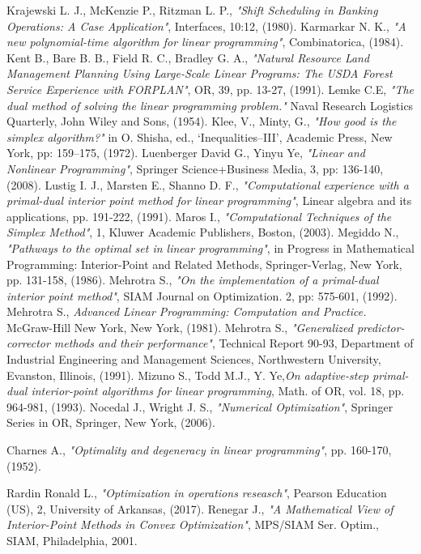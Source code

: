 \documentclass[a4paper,10 pt,titlepage,twoside]{book}
\theoremstyle{plain}
\theoremstyle{definition}
\theoremstyle{remark}
\begin{document}
{{\begin{thebibliography}{9}
		Krajewski L. J., McKenzie P., Ritzman L. P.,\textit{ "Shift Scheduling in Banking Operations: A Case Application"}, Interfaces, 10:12, (1980).
		 Karmarkar N. K.,\emph{ "A new polynomial-time algorithm for linear programming"}, Combinatorica, (1984).
		 Kent B., Bare B. B., Field R. C., Bradley G. A., \textit{"Natural Resource Land Management Planning Using Large-Scale Linear Programs: The USDA Forest Service Experience with FORPLAN"}, OR, 39, pp. 13-27, (1991).
		 Lemke C.E,\textit{ "The dual method of solving the linear programming problem."} Naval Research Logistics Quarterly, John Wiley and Sons, (1954).
		 Klee, V., Minty, G.,\emph{ "How good is the simplex algorithm?"} in O. Shisha, ed., ‘Inequalities–III’, Academic Press, New York, pp: 159–175, (1972).
		Luenberger David G., Yinyu Ye, \emph{"Linear and Nonlinear Programming"}, Springer Science+Business Media, 3, pp: 136-140, (2008).
		 Lustig I. J., Marsten E., Shanno D. F.,\emph{ "Computational experience with a primal-dual interior point method for linear programming"}, Linear algebra and its applications, pp. 191-222, (1991).
		 Maros I., \emph{"Computational Techniques of the Simplex Method"}, 1, Kluwer
		Academic Publishers, Boston, (2003).
		 Megiddo N., \emph{"Pathways to the optimal set in linear programming"}, in Progress in Mathematical Programming: Interior-Point and Related Methods, Springer-Verlag, New York, pp. 131-158, (1986).
	 Mehrotra S., \emph{ "On the implementation of a primal-dual interior point method"}, SIAM Journal on Optimization. 2, pp: 575-601, (1992).
	 Mehrotra S., \emph{ Advanced Linear Programming: Computation and
	Practice. } McGraw-Hill New York, New York, (1981).
 Mehrotra S., \emph{"Generalized predictor-corrector methods and their performance"}, Technical Report 90-93, Department of Industrial Engineering and Management Sciences, Northwestern University, Evanston, Illinois, (1991).
		Mizuno S., Todd M.J., Y. Ye,\emph{\;On adaptive-step primal-dual interior-point algorithms for linear programming}, Math. of OR, vol. 18, pp. 964-981, (1993). 
	Nocedal J., Wright J. S., \emph{\;"Numerical Optimization"}, Springer Series in OR, Springer, New York, (2006).

	  Charnes A., \emph{ "Optimality and degeneracy in linear programming"}, pp. 160-170, (1952). 

 Rardin Ronald L., \textit{"Optimization in operations reseasch"}, Pearson Education (US), 2, University of Arkansas, (2017).
Renegar J., \textit{ "A Mathematical View of Interior-Point Methods in Convex Optimization"}, MPS/SIAM
Ser. Optim., SIAM, Philadelphia, 2001.


\end{thebibliography}}}
\end{document}
